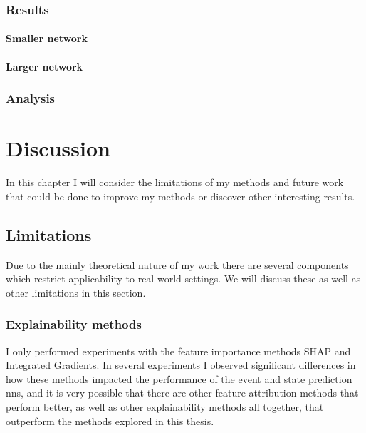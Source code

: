 \documentclass[UKenglish]{uiomasterthesis}
\begin{document}
\subsection{Results}


\subsubsection{Smaller network}


\subsubsection{Larger network}


\subsection{Analysis}



\chapter{Discussion}
\label{chap:disc}
In this chapter I will consider the limitations of my methods and future work that could be done to improve my methods or discover other interesting results.

\section{Limitations}
Due to the mainly theoretical nature of my work there are several components which restrict applicability to real world settings. We will discuss these as well as other limitations in this section.

\subsection{Explainability methods}
I only performed experiments with the feature importance methods SHAP and Integrated Gradients. In several experiments I observed significant differences in how these methods impacted the performance of the event and state prediction \acp{nn}, and it is very possible that there are other feature attribution methods that perform better, as well as other explainability methods all together, that outperform the methods explored in this thesis.
\end{document}

